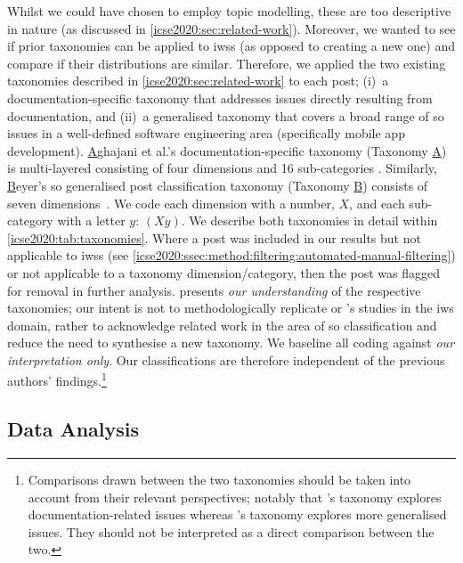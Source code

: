 Whilst we could have chosen to employ topic modelling, these are too descriptive in nature (as discussed in \cref{icse2020:sec:related-work}). Moreover, we wanted to see if prior taxonomies can be applied to \glspl{iws} (as opposed to creating a new one) and compare if their distributions are similar.
Therefore, we applied the two existing taxonomies described in \cref{icse2020:sec:related-work} to each post; (i)~a documentation-specific taxonomy that addresses issues directly resulting from documentation, and (ii)~a generalised taxonomy that covers a broad range of \gls{so} issues in a well-defined software engineering area (specifically mobile app development).
\uline{A}ghajani et al.'s documentation-specific taxonomy (Taxonomy \uline{A}) is multi-layered consisting of four dimensions and 16 sub-categories \citep{Aghajani:2019bo}. Similarly, \uline{B}eyer's \gls{so} generalised post classification taxonomy (Taxonomy \uline{B}) consists of seven dimensions~\citep{Beyer:2018fm}. We code each dimension with a number, $X$, and each sub-category with a letter $y$: $(Xy)$. We describe both taxonomies in detail within \cref{icse2020:tab:taxonomies}. Where a post was included in our results but not applicable to \glspl{iws} (see \cref{icse2020:ssec:method:filtering:automated-manual-filtering}) or not applicable to a taxonomy dimension/category, then the post was flagged for removal in further analysis.
 presents \textit{our understanding} of the respective taxonomies; our intent is not to methodologically replicate \citeauthor{Aghajani:2019bo} or \citeauthor{Beyer:2018fm}'s studies in the \gls{iws} domain, rather to acknowledge related work in the area of \gls{so} classification and reduce the need to synthesise a new taxonomy. We baseline all coding against \textit{our interpretation only}. Our classifications are therefore independent of the previous authors' findings.\footnote{Comparisons drawn between the two taxonomies should be taken into account from their relevant perspectives; notably that \citeauthor{Aghajani:2019bo}'s taxonomy explores documentation-related issues whereas  \citeauthor{Beyer:2018fm}'s taxonomy explores more generalised issues. They should not be interpreted as a direct comparison between the two.}


\afterpage{\begin{landscape}

\end{landscape}}

\subsection{Data Analysis}

